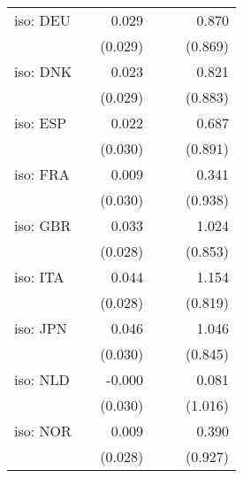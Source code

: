 \begin{tabular}{lrrrrr}
iso: DEU           &          &    0.029 &          &                        &                  0.870 \\ 
                   &          &  (0.029) &          &                        &                (0.869) \\ 
iso: DNK           &          &    0.023 &          &                        &                  0.821 \\ 
                   &          &  (0.029) &          &                        &                (0.883) \\ 
iso: ESP           &          &    0.022 &          &                        &                  0.687 \\ 
                   &          &  (0.030) &          &                        &                (0.891) \\ 
iso: FRA           &          &    0.009 &          &                        &                  0.341 \\ 
                   &          &  (0.030) &          &                        &                (0.938) \\ 
iso: GBR           &          &    0.033 &          &                        &                  1.024 \\ 
                   &          &  (0.028) &          &                        &                (0.853) \\ 
iso: ITA           &          &    0.044 &          &                        &                  1.154 \\ 
                   &          &  (0.028) &          &                        &                (0.819) \\ 
iso: JPN           &          &    0.046 &          &                        &                  1.046 \\ 
                   &          &  (0.030) &          &                        &                (0.845) \\ 
iso: NLD           &          &   -0.000 &          &                        &                  0.081 \\ 
                   &          &  (0.030) &          &                        &                (1.016) \\ 
iso: NOR           &          &    0.009 &          &                        &                  0.390 \\ 
                   &          &  (0.028) &          &                        &                (0.927) \\ 

\end{tabular}
